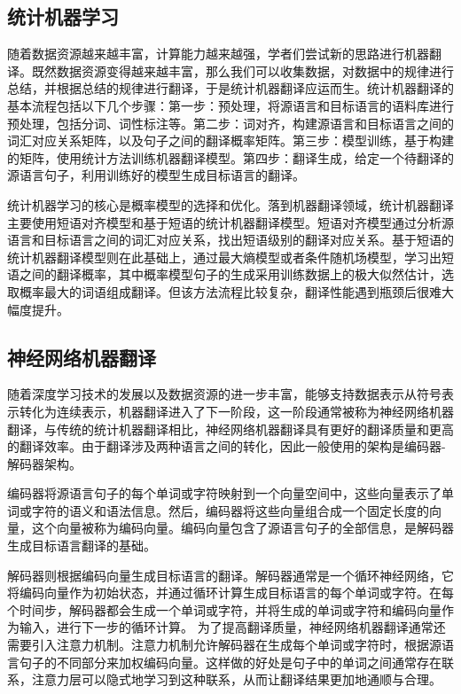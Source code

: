 \subsection{统计机器学习}

随着数据资源越来越丰富，计算能力越来越强，学者们尝试新的思路进行机器翻译。既然数据资源变得越来越丰富，那么我们可以收集数据，对数据中的规律进行总结，并根据总结的规律进行翻译，于是统计机器翻译应运而生。统计机器翻译的基本流程包括以下几个步骤：第一步：预处理，将源语言和目标语言的语料库进行预处理，包括分词、词性标注等。第二步：词对齐，构建源语言和目标语言之间的词汇对应关系矩阵，以及句子之间的翻译概率矩阵。第三步：模型训练，基于构建的矩阵，使用统计方法训练机器翻译模型。第四步：翻译生成，给定一个待翻译的源语言句子，利用训练好的模型生成目标语言的翻译。

统计机器学习的核心是概率模型的选择和优化。落到机器翻译领域，统计机器翻译主要使用短语对齐模型和基于短语的统计机器翻译模型。短语对齐模型通过分析源语言和目标语言之间的词汇对应关系，找出短语级别的翻译对应关系。基于短语的统计机器翻译模型则在此基础上，通过最大熵模型或者条件随机场模型，学习出短语之间的翻译概率，其中概率模型句子的生成采用训练数据上的极大似然估计，选取概率最大的词语组成翻译。但该方法流程比较复杂，翻译性能遇到瓶颈后很难大幅度提升。


\subsection{神经网络机器翻译}

随着深度学习技术的发展以及数据资源的进一步丰富，能够支持数据表示从符号表示转化为连续表示，机器翻译进入了下一阶段，这一阶段通常被称为神经网络机器翻译，与传统的统计机器翻译相比，神经网络机器翻译具有更好的翻译质量和更高的翻译效率。由于翻译涉及两种语言之间的转化，因此一般使用的架构是编码器-解码器架构。

编码器将源语言句子的每个单词或字符映射到一个向量空间中，这些向量表示了单词或字符的语义和语法信息。然后，编码器将这些向量组合成一个固定长度的向量，这个向量被称为编码向量。编码向量包含了源语言句子的全部信息，是解码器生成目标语言翻译的基础。

解码器则根据编码向量生成目标语言的翻译。解码器通常是一个循环神经网络，它将编码向量作为初始状态，并通过循环计算生成目标语言的每个单词或字符。在每个时间步，解码器都会生成一个单词或字符，并将生成的单词或字符和编码向量作为输入，进行下一步的循环计算。
为了提高翻译质量，神经网络机器翻译通常还需要引入注意力机制。注意力机制允许解码器在生成每个单词或字符时，根据源语言句子的不同部分来加权编码向量。这样做的好处是句子中的单词之间通常存在联系，注意力层可以隐式地学习到这种联系，从而让翻译结果更加地通顺与合理。

